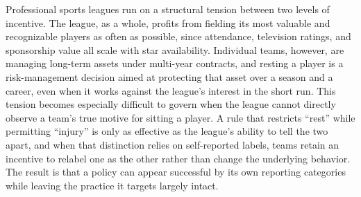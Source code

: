 \documentclass[11pt]{article}
\begin{document}
Professional sports leagues run on a structural tension between two levels of incentive. The league, as a whole, profits from fielding its most valuable and recognizable players as often as possible, since attendance, television ratings, and sponsorship value all scale with star availability. Individual teams, however, are managing long-term assets under multi-year contracts, and resting a player is a risk-management decision aimed at protecting that asset over a season and a career, even when it works against the league's interest in the short run. This tension becomes especially difficult to govern when the league cannot directly observe a team's true motive for sitting a player. A rule that restricts ``rest'' while permitting ``injury'' is only as effective as the league's ability to tell the two apart, and when that distinction relies on self-reported labels, teams retain an incentive to relabel one as the other rather than change the underlying behavior. The result is that a policy can appear successful by its own reporting categories while leaving the practice it targets largely intact.
\end{document}

